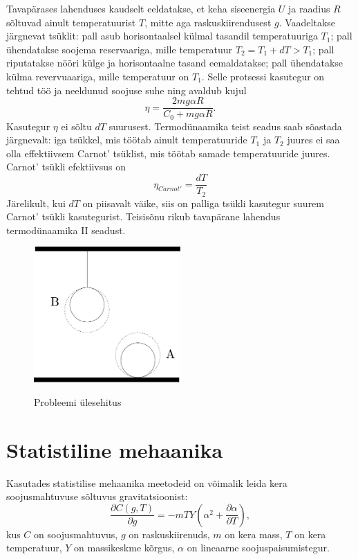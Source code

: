 \documentclass{trkut}%
\begin{document}
Tavapärases lahenduses kaudselt eeldatakse, et keha siseenergia \(U\) ja raadius \(R\) sõltuvad ainult temperatuurist \(T\), mitte aga raskuskiirendusest \(g\). Vaadeltakse järgnevat tsüklit: pall asub horisontaalsel külmal tasandil temperatuuriga \(T_1\); pall ühendatakse soojema reservaariga, mille temperatuur \(T_2=T_1+dT>T_1\); pall riputatakse nööri külge ja horisontaalne tasand eemaldatakse; pall ühendatakse külma revervuaariga, mille temperatuur on \(T_1\). Selle protsessi kasutegur on tehtud töö ja neeldunud soojuse suhe ning avaldub kujul \cite{palma15}
\begin{equation}
    \eta = \frac{2mg\alpha R}{C_0+mg\alpha R}.
\end{equation}
Kasutegur \(\eta\) ei sõltu \(dT\) suurusest. Termodünaamika teist seadus saab sõastada järgnevalt: iga tsükkel, mis töötab ainult temperatuuride \(T_1\) ja \(T_2\) juures ei saa olla effektiivsem Carnot' tsüklist, mis töötab samade temperatuuride juures. Carnot' tsükli efektiivsus on 
\begin{equation}
    \eta_{Carnot'} = \frac{dT}{T_2}
\end{equation}
Järelikult, kui \(dT\) on piisavalt väike, siis on palliga tsükli kasutegur suurem Carnot' tsükli kasutegurist. Teisisõnu rikub tavapärane lahendus termodünaamika II seadust.
\begin{figure}[h]
	\includegraphics[width=0.5\textwidth]{joonis1.pdf}
	\caption{Probleemi ülesehitus}
    \cite{palma15}
	\allikas{}
	\label{iphojoonis}%
\end{figure}

\section{Statistiline mehaanika}

Kasutades statistilise mehaanika meetodeid on võimalik leida kera soojusmahtuvuse sõltuvus gravitatsioonist:
\begin{equation}
    \frac{\partial C(g,T)}{\partial g} = -mTY \left( \alpha^2 + \frac{\partial \alpha}{\partial T} \right),
\end{equation}
kus \(C\) on soojusmahtuvus, \(g\) on raskuskiirenuds, \(m\) on kera mass, \(T\) on kera temperatuur, \(Y\) on massikeskme kõrgus, \(\alpha\) on lineaarne soojuspaisumistegur. 
\end{document}
